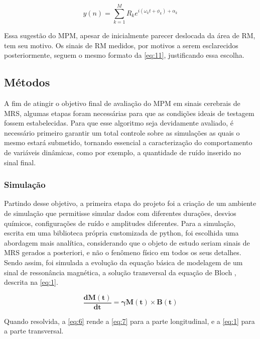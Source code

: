 \documentclass[12pt]{article}
\begin{document}
\begin{equation} \label{eq:11}
    y(n) = \sum_{k=1}^{M} R_k e^{i (\omega_k t + \phi_k) + \alpha_k }
\end{equation}

Essa sugestão do MPM, apesar de inicialmente parecer deslocada da área de RM, tem seu motivo. Os sinais de RM medidos, por motivos a serem esclarecidos posteriormente, seguem o mesmo
formato da \autoref{eq:11}, justificando essa escolha.

\subsection{Métodos}

A fim de atingir o objetivo final de avaliação do MPM em sinais cerebrais de MRS, algumas etapas foram 
necessárias para que as condições ideais de testagem fossem estabelecidas. Para que esse algoritmo 
seja devidamente avaliado, é necessário primeiro garantir um total controle sobre as simulações as quais o mesmo estará submetido,
tornando essencial a caracterização do comportamento de variáveis dinâmicas, como por exemplo, a quantidade de ruído inserido no sinal final.


\subsubsection{Simulação}

Partindo desse objetivo, a primeira etapa do projeto foi a criação de um ambiente de simulação
que permitisse simular dados com diferentes durações, desvios químicos, configurações de ruído e amplitudes diferentes. Para a simulação, escrita em uma biblioteca 
própria customizada de python, foi escolhida uma abordagem mais analítica, considerando que o objeto de estudo seriam
sinais de MRS gerados a posteriori, e não o fenômeno físico em todos os seus detalhes. Sendo assim, foi simulada a evolução 
da equação básica de modelagem de um sinal de ressonância magnética, a solução transversal da equação de Bloch \cite{PhysRev.70.460}, 
descrita na \autoref{eq:1}.

\begin{equation} \label{eq:6}
    \mathbf{\frac{dM(t)}{dt}} = \mathbf{\gamma M(t)} \times \mathbf{B(t)}
\end{equation}

Quando resolvida, a \autoref{eq:6} rende a \autoref{eq:7} para a parte longitudinal, e a \autoref{eq:1} para a parte transversal.
\end{document}
